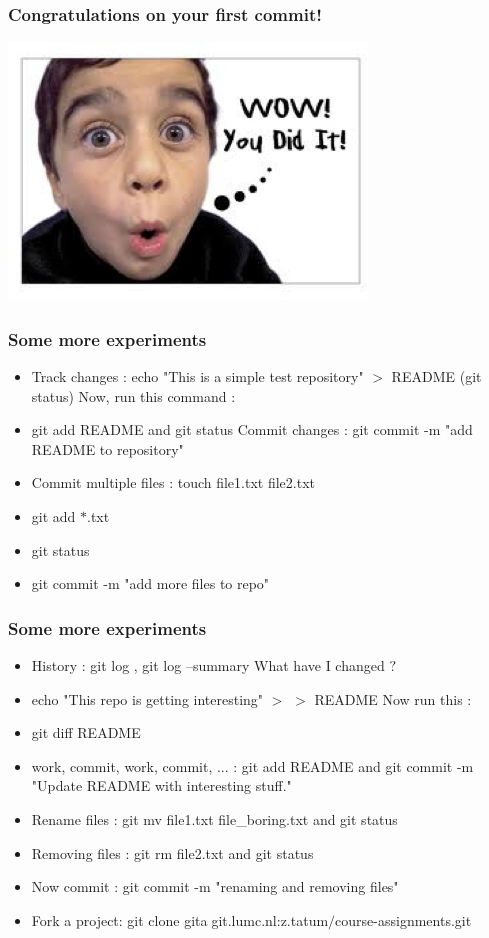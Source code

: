 \documentclass{beamer}
\begin{document}
\begin{frame}
\frametitle{ Congratulations on your first commit!}
\includegraphics[scale=0.8]{ydi.jpg}
\end{frame}

\begin{frame}
  \frametitle{Some more experiments}
      \begin{itemize}
	\item Track changes :  echo "This is a simple test repository" $>$ README  (git status)\newline
	\text Now, run this command :
	\item git add README and git status\newline
	\text Commit changes : git commit -m "add README to repository"
	\item Commit multiple files : touch file1.txt file2.txt
	\item git add $*$.txt
	\item git status
	\item git commit -m "add more files to repo" 
      \end{itemize}
\end{frame}


\begin{frame}
\frametitle{Some more experiments}
	\begin{itemize}
		\item History : git log , git log --summary\newline
		\text What have I changed $?$
		\item echo "This repo is getting interesting" $>$ $>$ README \newline
		\text Now run this :
		\item git diff README
		\item work, commit, work, commit, ... : git add README and git commit -m "Update README with interesting stuff."
		\item Rename files : git mv file1.txt file\_boring.txt and git status
		\item Removing files : git rm file2.txt and git status
		\item Now commit : git commit -m "renaming and removing files"
		 \item Fork a project: git clone git\textcircled{a}git.lumc.nl:z.tatum$/$course-assignments.git
\end{itemize}
\end{frame}
\end{document}
